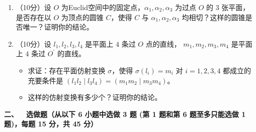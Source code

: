 \begin{enumerate}
\begin{itemize}
\item[(c)] 计算 $\gamma$ 的中心的坐标。
\end{itemize}
\item（10分）设 $O$ 为Euclid空间中的固定点，$\alpha_{1}, \alpha_{2}, \alpha_{3}$ 为过点 $O$ 的 $3$ 张平面，
是否存在以 $O$ 为顶点的圆锥 $C$，使得 $C$ 与 $\alpha_{1}, \alpha_{2}, \alpha_{3}$ 均相切？这样的圆锥是否唯一？证明你的结论。
\item（10分）设 $l_{1}, l_{2}, l_{3}, l_{4}$ 是平面上 $4$ 条过 $O$ 点的直线，
$m_{1}, m_{2}, m_{3}, m_{4}$ 是平面上 $4$ 条过 $O^{\prime}$ 的直线。
\begin{itemize}
\item[(a)] 求证：存在平面仿射变换 $\sigma$，使得 $\sigma(l_{i})=m_{i}$ 对 $i=1,2,3,4$ 都成立的充要条件是 
$(l_{1} l_{2} \mid l_{3} l_{4})=(m_{1} m_{2} \mid m_{3} m_{4})$。
\item[(b)] 这样的仿射变换有多少个？证明你的结论。
\end{itemize}
\end{enumerate}
\textbf{二、\ \ 选做题（从以下 6 小题中选做 3 题 
(第 1 题和第 6 题至多只能选做 1 题)，每题 15 分，共 45 分）}
